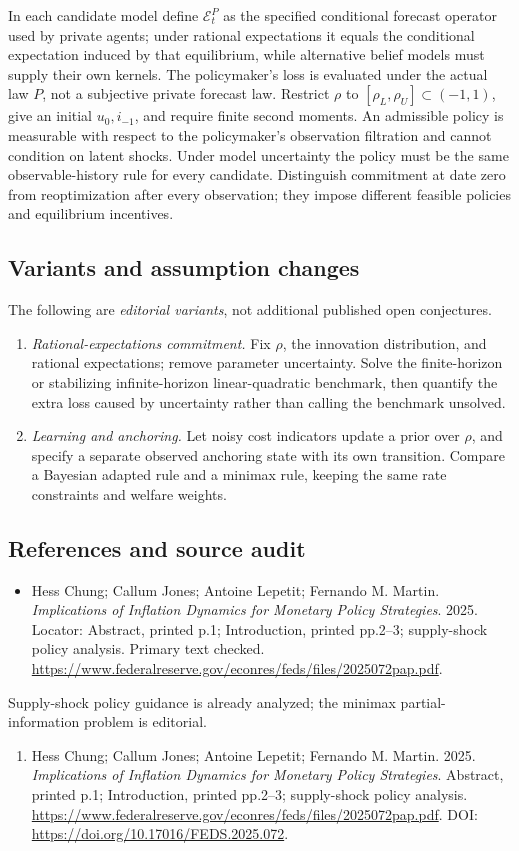\documentclass[11pt,a4paper]{article}
\begin{document}
In each candidate model define \(\mathcal E_t^P\) as the specified conditional forecast operator used by private agents; under rational expectations it equals the conditional expectation induced by that equilibrium, while alternative belief models must supply their own kernels. The policymaker's loss is evaluated under the actual law \(P\), not a subjective private forecast law. Restrict \(\rho\) to \([\rho_L,\rho_U]\subset(-1,1)\), give an initial \(u_0,i_{-1}\), and require finite second moments. An admissible policy is measurable with respect to the policymaker's observation filtration and cannot condition on latent shocks. Under model uncertainty the policy must be the same observable-history rule for every candidate. Distinguish commitment at date zero from reoptimization after every observation; they impose different feasible policies and equilibrium incentives.
\subsection*{Variants and assumption changes}
The following are \emph{editorial variants}, not additional published open conjectures.
\begin{enumerate}
\item \emph{Rational-expectations commitment.} Fix \(\rho\), the innovation distribution, and rational expectations; remove parameter uncertainty. Solve the finite-horizon or stabilizing infinite-horizon linear-quadratic benchmark, then quantify the extra loss caused by uncertainty rather than calling the benchmark unsolved.
\item \emph{Learning and anchoring.} Let noisy cost indicators update a prior over \(\rho\), and specify a separate observed anchoring state with its own transition. Compare a Bayesian adapted rule and a minimax rule, keeping the same rate constraints and welfare weights.
\end{enumerate}
\subsection*{References and source audit}
\begin{itemize}
\item Hess Chung; Callum Jones; Antoine Lepetit; Fernando M. Martin. \emph{Implications of Inflation Dynamics for Monetary Policy Strategies}. 2025. Locator: Abstract, printed p.1; Introduction, printed pp.2--3; supply-shock policy analysis. Primary text checked. \url{https://www.federalreserve.gov/econres/feds/files/2025072pap.pdf}.
\end{itemize}
Supply-shock policy guidance is already analyzed; the minimax partial-information problem is editorial.
\begin{enumerate}\raggedright
\item\hypertarget{definitions:source:30007529:1}{} Hess Chung; Callum Jones; Antoine Lepetit; Fernando M. Martin. 2025. \emph{Implications of Inflation Dynamics for Monetary Policy Strategies}. Abstract, printed p.1; Introduction, printed pp.2--3; supply-shock policy analysis.
\url{https://www.federalreserve.gov/econres/feds/files/2025072pap.pdf}.
DOI: \url{https://doi.org/10.17016/FEDS.2025.072}.
\end{enumerate}
\end{document}
